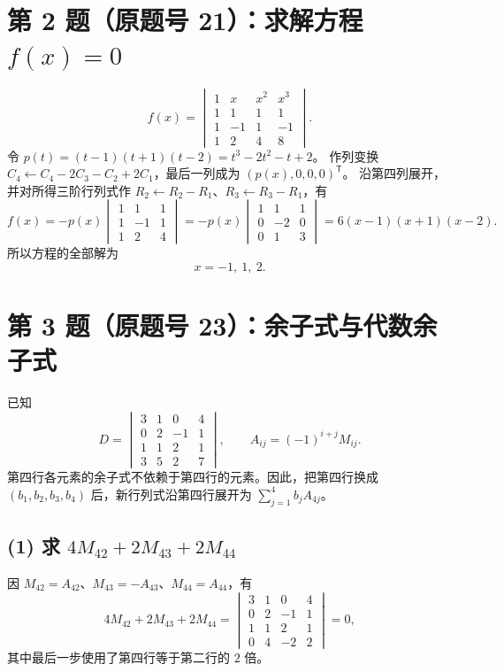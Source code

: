 \documentclass[11pt,a4paper,fontset=fandol]{ctexart}
\newcommand{\T}{^{\mathsf T}}
\newcommand{\ans}[1]{\boxed{#1}}
\begin{document}
\newpage
\section*{第 2 题（原题号 21）：求解方程 $f(x)=0$}
\[
f(x)=\begin{vmatrix}
1&x&x^2&x^3\\
1&1&1&1\\
1&-1&1&-1\\
1&2&4&8
\end{vmatrix}.
\]
令 $p(t)=(t-1)(t+1)(t-2)=t^3-2t^2-t+2$。
作列变换 $C_4\leftarrow C_4-2C_3-C_2+2C_1$，最后一列成为 $(p(x),0,0,0)\T$。
沿第四列展开，并对所得三阶行列式作 $R_2\leftarrow R_2-R_1$、$R_3\leftarrow R_3-R_1$，有
\[
f(x)=-p(x)\begin{vmatrix}1&1&1\\1&-1&1\\1&2&4\end{vmatrix}
=-p(x)\begin{vmatrix}1&1&1\\0&-2&0\\0&1&3\end{vmatrix}
=6(x-1)(x+1)(x-2).
\]
所以方程的全部解为
\[
\ans{x=-1,\ 1,\ 2}.
\]

\section*{第 3 题（原题号 23）：余子式与代数余子式}
已知
\[
D=\begin{vmatrix}
3&1&0&4\\0&2&-1&1\\1&1&2&1\\3&5&2&7
\end{vmatrix},\qquad A_{ij}=(-1)^{i+j}M_{ij}.
\]
第四行各元素的余子式不依赖于第四行的元素。因此，把第四行换成
$(b_1,b_2,b_3,b_4)$ 后，新行列式沿第四行展开为 $\sum_{j=1}^4 b_jA_{4j}$。

\subsection*{(1) 求 $4M_{42}+2M_{43}+2M_{44}$}
因 $M_{42}=A_{42}$、$M_{43}=-A_{43}$、$M_{44}=A_{44}$，有
\[
4M_{42}+2M_{43}+2M_{44}
=\begin{vmatrix}
3&1&0&4\\0&2&-1&1\\1&1&2&1\\0&4&-2&2
\end{vmatrix}=\ans{0},
\]
其中最后一步使用了第四行等于第二行的 $2$ 倍。
\end{document}
